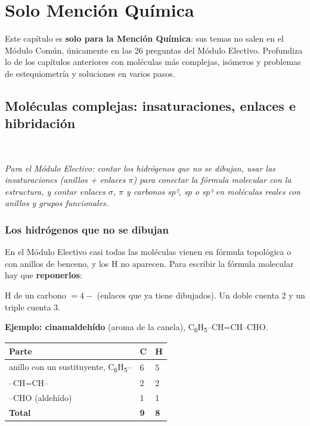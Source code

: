 \chapter{Solo Mención Química}
Este capítulo es \textbf{solo para la Mención Química}: sus temas no salen en el Módulo Común, únicamente en las 26 preguntas del Módulo Electivo. Profundiza lo de los capítulos anteriores con moléculas más complejas, isómeros y problemas de estequiometría y soluciones en varios pasos.

\section[Moléculas complejas: insaturaciones, enlaces e hibridación (Mención)]{Moléculas complejas: insaturaciones, enlaces e hibridación}
\modmencion\ \ {\color{gris}\itshape Para el Módulo Electivo: contar los hidrógenos que no se dibujan, usar las insaturaciones (anillos + enlaces \ensuremath{\pi}) para conectar la fórmula molecular con la estructura, y contar enlaces \ensuremath{\sigma}, \ensuremath{\pi} y carbonos sp², sp o sp³ en moléculas reales con anillos y grupos funcionales.\par}
\subsection{Los hidrógenos que no se dibujan}
En el Módulo Electivo casi todas las moléculas vienen en fórmula topológica o con anillos de benceno, y los H no aparecen. Para escribir la fórmula molecular hay que \textbf{reponerlos}:

 
\begin{clave}[{Regla}] H de un carbono $= 4 -$ (enlaces que ya tiene dibujados). Un doble cuenta 2 y un triple cuenta 3.\end{clave}
 

\textbf{Ejemplo: cinamaldehído} (aroma de la canela), C\textsubscript{6}H\textsubscript{5}--CH=CH--CHO.

 
\begin{center}\small
\begin{tabular}{@{}lll@{}}
\toprule
\textbf{Parte} & \textbf{C} & \textbf{H} \\
\midrule
anillo con un sustituyente, C\textsubscript{6}H\textsubscript{5}-- & 6 & 5 \\
--CH=CH-- & 2 & 2 \\
--CHO (aldehído) & 1 & 1 \\
\textbf{Total} & \textbf{9} & \textbf{8} \\
\bottomrule
\end{tabular}
\end{center}
 

